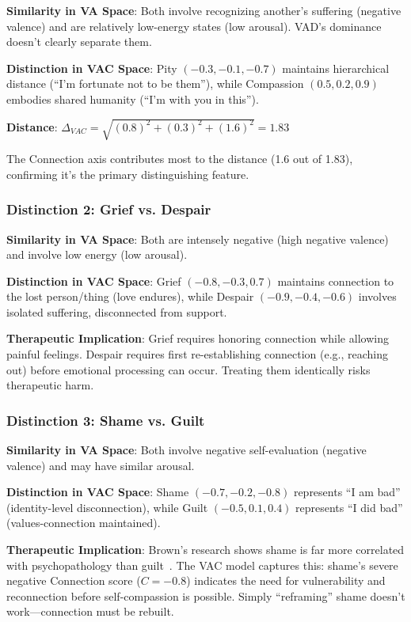 \documentclass[10pt,twocolumn]{article}
\begin{document}
\textbf{Similarity in VA Space}: Both involve recognizing another's suffering (negative valence) and are relatively low-energy states (low arousal). VAD's dominance doesn't clearly separate them.

\textbf{Distinction in VAC Space}: Pity $(-0.3, -0.1, -0.7)$ maintains hierarchical distance (``I'm fortunate not to be them''), while Compassion $(0.5, 0.2, 0.9)$ embodies shared humanity (``I'm with you in this'').

\textbf{Distance}: $\Delta_{VAC} = \sqrt{(0.8)^2 + (0.3)^2 + (1.6)^2} = 1.83$

The Connection axis contributes most to the distance (1.6 out of 1.83), confirming it's the primary distinguishing feature.

\subsubsection{Distinction 2: Grief vs. Despair}

\textbf{Similarity in VA Space}: Both are intensely negative (high negative valence) and involve low energy (low arousal).

\textbf{Distinction in VAC Space}: Grief $(-0.8, -0.3, 0.7)$ maintains connection to the lost person/thing (love endures), while Despair $(-0.9, -0.4, -0.6)$ involves isolated suffering, disconnected from support.

\textbf{Therapeutic Implication}: Grief requires honoring connection while allowing painful feelings. Despair requires first re-establishing connection (e.g., reaching out) before emotional processing can occur. Treating them identically risks therapeutic harm.

\subsubsection{Distinction 3: Shame vs. Guilt}

\textbf{Similarity in VA Space}: Both involve negative self-evaluation (negative valence) and may have similar arousal.

\textbf{Distinction in VAC Space}: Shame $(-0.7, -0.2, -0.8)$ represents ``I am bad'' (identity-level disconnection), while Guilt $(-0.5, 0.1, 0.4)$ represents ``I did bad'' (values-connection maintained).

\textbf{Therapeutic Implication}: Brown's research shows shame is far more correlated with psychopathology than guilt~\cite{brown2006}. The VAC model captures this: shame's severe negative Connection score ($C = -0.8$) indicates the need for vulnerability and reconnection before self-compassion is possible. Simply ``reframing'' shame doesn't work—connection must be rebuilt.
\end{document}
